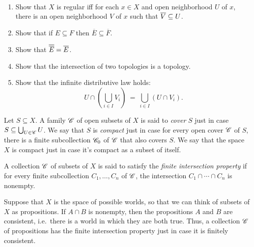 \begin{exercise} \mbox{ }
\begin{enumerate}
\item Show that $X$ is regular iff for each $x\in X$ and open
  neighborhood $U$ of $x$, there is an open neighborhood $V$ of $x$
  such that $\overline{V}\subseteq U$.
\item Show that if $E\subseteq F$ then $\overline{E}\subseteq
  \overline{F}$.
\item Show that $\overline{\overline{E}}=\overline{E}$.
\item Show that the intersection of two topologies is a topology.
\item Show that the infinite distributive law holds:
\[ U\cap \left( \bigcup _{i\in I}V_i \right) \: = \: \bigcup  _{i\in
  I}(U\cap V_i ) .\]
\end{enumerate} \end{exercise}


\begin{defn} Let $S\subseteq X$.  A family $\mathscr C$ of open subsets of
  $X$ is said to \emph{cover} $S$ just in case $S\subseteq \bigcup
  _{U\in \mathscr C}U$.  We say that $S$ is \emph{compact} just in case for
  every open cover $\mathscr C$ of $S$, there is a finite subcollection $\mathscr C
  _0$ of $\mathscr C$ that also covers $S$.  We say that the space $X$ is
  compact just in case it's compact as a subset of itself.  \end{defn}

\begin{defn} A collection $\mathscr C$ of subsets of $X$ is said to satisfy
  the \emph{finite intersection property} if for every finite
  subcollection $C_1,\dots ,C_n$ of $\mathscr C$, the intersection $C_1\cap
  \cdots \cap C_n$ is nonempty. \end{defn}

\begin{disc} Suppose that $X$ is the space of possible worlds, so that
  we can think of subsets of $X$ as propositions.  If $A\cap B$ is
  nonempty, then the propositions $A$ and $B$ are consistent, i.e.\
  there is a world in which they are both true.  Thus, a collection
  $\mathscr C$ of propositions has the finite intersection property just in
  case it is finitely consistent.
\end{disc}


